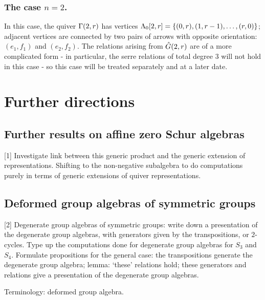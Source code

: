 \documentclass[a4paper, 11pt]{report}
\begin{document}
\subsection{The case $n= 2$.}

In this case, the quiver $\presentationquiver[2,r]$ has vertices $\compositions[2,r]=\{(0,r), (1,r-1),\ldots, (r,0)\}$; adjacent vertices are connected by two pairs of arrows with opposite orientation: $(e_1,f_1)$ and $(e_2,f_2)$. The relations arising from $\generic[2,r]$ are of a more complicated form - in particular, the serre relations of total degree $3$ will not hold in this case - so this case will be treated separately and at a later date.

\chapter{Further directions}

\section{Further results on affine zero Schur algebras}

[1] Investigate link between this generic product and the generic extension of representations. Shifting to the non-negative subalgebra to do computations purely in terms of generic extensions of quiver representations.

\section{Deformed group algebras of symmetric groups}

[2] Degenerate group algebras of symmetric groups: write down a presentation of the degenerate group algebras, with generators given by the transpositions, or $2$-cycles. Type up the computations done for degenerate group algebras for $S_3$ and $S_4$. Formulate propositions for the general case: the transpositions generate the degenerate group algebra; lemma: `these' relations hold; these generators and relations give a presentation of the degenerate group algebras.

Terminology: deformed group algebra.


\printbibliography
\end{document}
